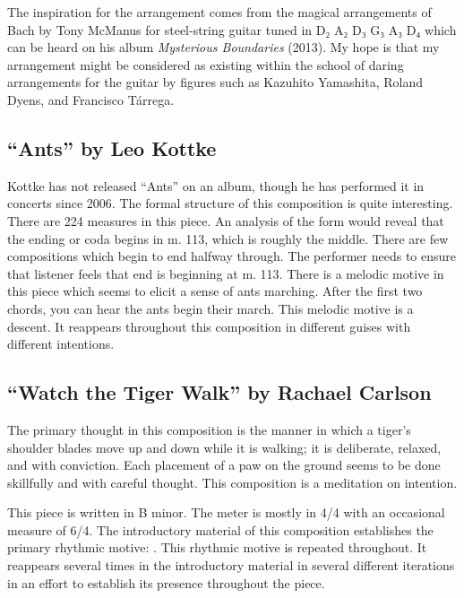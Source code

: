 \documentclass{tufte-handout}
\begin{document}
The inspiration for the arrangement comes from the magical arrangements of
Bach by Tony McManus for steel-string guitar tuned in D₂ A₂ D₃ G₃ A₃ D₄ which
can be heard on his album \emph{Mysterious Boundaries} (2013). My hope is that
my arrangement might be considered as existing within the school of daring
arrangements for the guitar by figures such as Kazuhito Yamashita, Roland
Dyens, and Francisco Tárrega.
\subsection*{``Ants'' by Leo Kottke}
\label{sec:ants-leo-kottke}
Kottke has not released ``Ants'' on an album, though he has performed
it in concerts since 2006. The formal structure of this composition is
quite interesting. There are 224 measures in this piece. An analysis
of the form would reveal that the ending or coda begins in m. 113,
which is roughly the middle. There are few compositions which begin to
end halfway through. The performer needs to ensure that listener feels
that end is beginning at m. 113. There is a melodic motive in this
piece which seems to elicit a sense of ants marching. After the first
two chords, you can hear the ants begin their march. This melodic
motive is a descent. It reappears throughout this composition in
different guises with different intentions.
\subsection*{``Watch the Tiger Walk'' by Rachael Carlson}
\label{sec:watch-tiger-walk}
The primary thought in this composition is the manner in which a tiger's shoulder blades move up and down while it is walking; it is deliberate, relaxed, and with conviction. Each placement of a paw on the ground seems to be done skillfully and with careful thought. This composition is a meditation on intention.

This piece is written in B minor. The meter is mostly in 4/4 with an
occasional measure of 6/4. The introductory material of this
composition establishes the primary rhythmic motive: \ViPa \AcPa \Acht
\AAcht \Vier. This rhythmic motive is repeated throughout. It
reappears several times in the introductory material in several
different iterations in an effort to establish its presence throughout
the piece.


\end{document}
